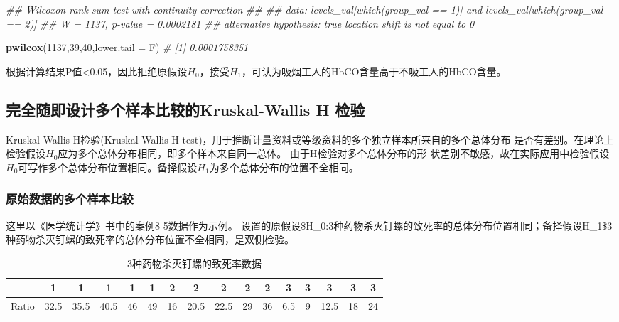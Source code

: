 \documentclass[
]{article}
\newenvironment{Shaded}{\begin{snugshade}}{\end{snugshade}}
\newcommand{\CommentTok}[1]{\textcolor[rgb]{0.56,0.35,0.01}{\textit{#1}}}
\newcommand{\DataTypeTok}[1]{\textcolor[rgb]{0.13,0.29,0.53}{#1}}
\newcommand{\DecValTok}[1]{\textcolor[rgb]{0.00,0.00,0.81}{#1}}
\newcommand{\KeywordTok}[1]{\textcolor[rgb]{0.13,0.29,0.53}{\textbf{#1}}}
\newcommand{\NormalTok}[1]{#1}
\begin{document}
\begin{Shaded}
\begin{Highlighting}[]
\CommentTok{##  Wilcoxon rank sum test with continuity correction}
\CommentTok{## }
\CommentTok{## data:  levels_val[which(group_val == 1)] and levels_val[which(group_val == 2)]}
\CommentTok{## W = 1137, p-value = 0.0002181}
\CommentTok{##  alternative hypothesis: true location shift is not equal to 0}

\KeywordTok{pwilcox}\NormalTok{(}\DecValTok{1137}\NormalTok{,}\DecValTok{39}\NormalTok{,}\DecValTok{40}\NormalTok{,}\DataTypeTok{lower.tail =}\NormalTok{ F)}
\CommentTok{# [1] 0.0001758351}
\end{Highlighting}
\end{Shaded}

根据计算结果P值\textless0.05，因此拒绝原假设\(H_0\)，接受\(H_1\)，可认为吸烟工人的HbCO含量高于不吸工人的HbCO含量。

\hypertarget{ux5b8cux5168ux968fux5373ux8bbeux8ba1ux591aux4e2aux6837ux672cux6bd4ux8f83ux7684kruskal-wallis-h-ux68c0ux9a8c}{%
\subsection{完全随即设计多个样本比较的Kruskal-Wallis H 检验}\label{ux5b8cux5168ux968fux5373ux8bbeux8ba1ux591aux4e2aux6837ux672cux6bd4ux8f83ux7684kruskal-wallis-h-ux68c0ux9a8c}}

Kruskal-Wallis H检验(Kruskal-Wallis H test)，用于推断计量资料或等级资料的多个独立样本所来自的多个总体分布
是否有差别。在理论上检验假设\(H_0\)应为多个总体分布相同，即多个样本来自同一总体。 由于H检验对多个总体分布的形
状差别不敏感，故在实际应用中检验假设\(H_0\)可写作多个总体分布位置相同。备择假设\(H_1\)为多个总体分布的位置不全相同。

\hypertarget{ux539fux59cbux6570ux636eux7684ux591aux4e2aux6837ux672cux6bd4ux8f83}{%
\subsubsection{原始数据的多个样本比较}\label{ux539fux59cbux6570ux636eux7684ux591aux4e2aux6837ux672cux6bd4ux8f83}}

这里以《医学统计学》书中的案例8-5数据作为示例。
设置的原假设\$H\_0:\(3种药物杀灭钉螺的致死率的总体分布位置相同；备择假设\)H\_1\$3种药物杀灭钉螺的致死率的总体分布位置不全相同，是双侧检验。

\begin{table}

\caption{\label{tab:ranktab1}3种药物杀灭钉螺的致死率数据}
\centering
\begin{tabular}[t]{lccccccccccccccc}
\toprule
  & 1 & 1 & 1 & 1 & 1 & 2 & 2 & 2 & 2 & 2 & 3 & 3 & 3 & 3 & 3\\
\midrule
Ratio & 32.5 & 35.5 & 40.5 & 46 & 49 & 16 & 20.5 & 22.5 & 29 & 36 & 6.5 & 9 & 12.5 & 18 & 24\\
\bottomrule
\end{tabular}
\end{table}
\end{document}

